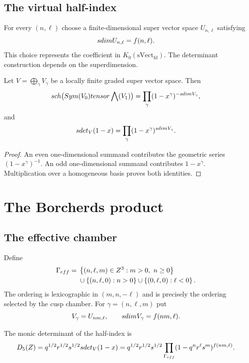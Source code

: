 \section{The virtual half-index}
For every $(n,\ell)$ choose a finite-dimensional super vector space $U_{n,\ell}$ satisfying
\[
 sdim U_{n,\ell}=f(n,\ell).
\]
This choice represents the coefficient in $K_0(\mathrm{sVect}_{\mathrm{fd}})$. The determinant construction depends on the superdimension.

\begin{lemma}
Let $V=\bigoplus_{\gamma}V_\gamma$ be a locally finite graded super vector space. Then
\[
 sch\bigl(Sym(V_{0})tensor\bigwedge(V_{1})\bigr)
 =\prod_\gamma(1-x^\gamma)^{-sdim V_\gamma},
\]
and
\[
 sdet_V(1-x)=\prod_\gamma(1-x^\gamma)^{sdim V_\gamma}.
\]
\end{lemma}
\begin{proof}
An even one-dimensional summand contributes the geometric series $(1-x^\gamma)^{-1}$. An odd one-dimensional summand contributes $1-x^\gamma$. Multiplication over a homogeneous basis proves both identities.
\end{proof}

\chapter{The Borcherds product}
\section{The effective chamber}
Define
\[
\begin{aligned}
\Gamma_{eff}={}&\left\{(n,\ell,m)\in Z^3:m>0,\ n\ge0\right\}\\
&\cup\left\{(n,\ell,0):n>0\right\}
 \cup\left\{(0,\ell,0):\ell<0\right\}.
\end{aligned}
\]
The ordering is lexicographic in $(m,n,-\ell)$ and is precisely the ordering selected by the cusp chamber.
For $\gamma=(n,\ell,m)$ put
\[
 V_\gamma=U_{nm,\ell},
 \qquad sdim V_\gamma=f(nm,\ell).
\]

\begin{definition}
The monic determinant of the half-index is
\[
 {D_5}(Z)=q^{1/2}r^{1/2}s^{1/2}
 sdet_V(1-x)
 =q^{1/2}r^{1/2}s^{1/2}
 \prod_{\Gamma_{eff}}(1-q^nr^\ell s^m)^{f(nm,\ell)}.
\]
\end{definition}

